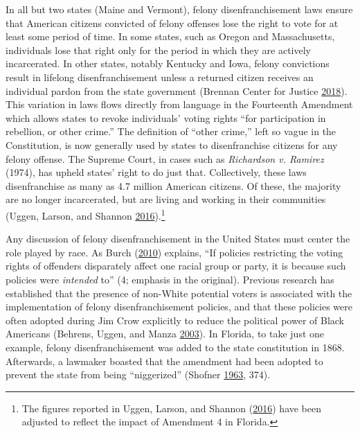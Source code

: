 \documentclass[12pt,]{article}
\let\rmarkdownfootnote\footnote%
\def\footnote{\protect\rmarkdownfootnote}
\begin{document}
In all but two states (Maine and Vermont), felony disenfranchisement laws ensure that American citizens convicted of felony offenses lose the right to vote for at least some period of time. In some states, such as Oregon and Massachusetts, individuals lose that right only for the period in which they are actively incarcerated. In other states, notably Kentucky and Iowa, felony convictions result in lifelong disenfranchisement unless a returned citizen receives an individual pardon from the state government (Brennan Center for Justice \protect\hyperlink{ref-bcj_laws}{2018}). This variation in laws flows directly from language in the Fourteenth Amendment which allows states to revoke individuals' voting rights ``for participation in rebellion, or other crime.'' The definition of ``other crime,'' left so vague in the Constitution, is now generally used by states to disenfranchise citizens for any felony offense. The Supreme Court, in cases such as \emph{Richardson v. Ramirez} (1974), has upheld states' right to do just that. Collectively, these laws disenfranchise as many as 4.7 million American citizens. Of these, the majority are no longer incarcerated, but are living and working in their communities (Uggen, Larson, and Shannon \protect\hyperlink{ref-sentencing_2016}{2016}).\footnote{The figures reported in Uggen, Larson, and Shannon (\protect\hyperlink{ref-sentencing_2016}{2016}) have been adjusted to reflect the impact of Amendment 4 in Florida.}

Any discussion of felony disenfranchisement in the United States must center the role played by race. As Burch (\protect\hyperlink{ref-Burch2010}{2010}) explains, ``If policies restricting the voting rights of offenders disparately affect one racial group or party, it is because such policies were \emph{intended} to'' (4; emphasis in the original). Previous research has established that the presence of non-White potential voters is associated with the implementation of felony disenfranchisement policies, and that these policies were often adopted during Jim Crow explicitly to reduce the political power of Black Americans (Behrens, Uggen, and Manza \protect\hyperlink{ref-Behrens2003}{2003}). In Florida, to take just one example, felony disenfranchisement was added to the state constitution in 1868. Afterwards, a lawmaker boasted that the amendment had been adopted to prevent the state from being ``niggerized'' (Shofner \protect\hyperlink{ref-florida_1868}{1963}, 374).
\end{document}

